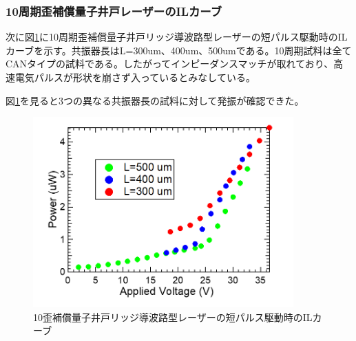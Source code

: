{\newpage
\subsubsection{10周期歪補償量子井戸レーザーのILカーブ}
次に図\ref{fig:fig_3_2_10QW_ridge_GS_power}に10周期歪補償量子井戸リッジ導波路型レーザーの短パルス駆動時のILカーブを示す。共振器長はL=300um、400um、500umである。10周期試料は全てCANタイプの試料である。したがってインピーダンスマッチが取れており、高速電気パルスが形状を崩さず入っているとみなしている。

図\ref{fig:fig_3_2_10QW_ridge_GS_power}を見ると3つの異なる共振器長の試料に対して発振が確認できた。
\begin{figure}[h]
	\centering
	\includegraphics[width=10cm]{figure/fig_3_2_10QW_ridge_GS_power.png}
		\caption{10歪補償量子井戸リッジ導波路型レーザーの短パルス駆動時のILカーブ}
		\label{fig:fig_3_2_10QW_ridge_GS_power}
\end{figure}
\clearpage
}
